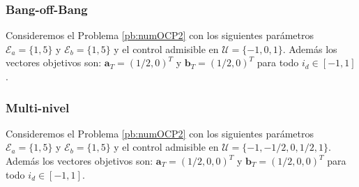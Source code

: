 \subsubsection{Bang-off-Bang}
Consideremos el Problema \ref{pb:numOCP2} con los siguientes parámetros $\mathcal{E}_a = \{1,5\}$ y  $\mathcal{E}_b = \{1,5\}$ y el control admisible en $\mathcal{U} = \{-1,0,1\}$. Además los vectores objetivos son: $\bm{a}_T = (1/2,0)^T$ y $\bm{b}_T = (1/2,0)^T$  para todo $i_d \in [-1,1]$. 

\subsubsection{Multi-nivel}

Consideremos el Problema \ref{pb:numOCP2} con los siguientes parámetros $\mathcal{E}_a = \{1,5\}$ y  $\mathcal{E}_b = \{1,5\}$ y el control admisible en $\mathcal{U} = \{-1,-1/2,0,1/2,1\}$. Además los vectores objetivos son: $\bm{a}_T = (1/2,0,0)^T$ y $\bm{b}_T = (1/2,0,0)^T$  para todo $i_d \in [-1,1]$.  
